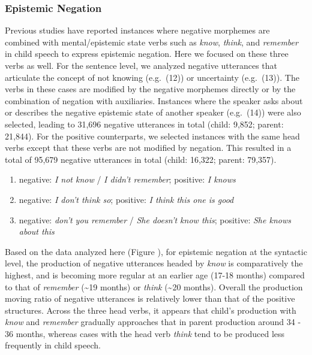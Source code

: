 \documentclass[
  english,
  man,floatsintext]{apa6}
\providecommand{\tightlist}{%
  \setlength{\itemsep}{0pt}\setlength{\parskip}{0pt}}
\begin{document}
\hypertarget{epistemic-negation}{%
\subsubsection{Epistemic Negation}\label{epistemic-negation}}

Previous studies have reported instances where negative morphemes are combined with mental/epistemic state verbs such as \emph{know}, \emph{think}, and \emph{remember} in child speech to express epistemic negation. Here we focused on these three verbs as well. For the sentence level, we analyzed negative utterances that articulate the concept of not knowing (e.g.~(12)) or uncertainty (e.g.~(13)). The verbs in these cases are modified by the negative morphemes directly or by the combination of negation with auxiliaries. Instances where the speaker asks about or describes the negative epistemic state of another speaker (e.g.~(14)) were also selected, leading to 31,696 negative utterances in total (child: 9,852; parent: 21,844).
For the positive counterparts, we selected instances with the same head verbs except that these verbs are not modified by negation. This resulted in a total of 95,679 negative utterances in total (child: 16,322; parent: 79,357).

\begin{enumerate}
\def\labelenumi{(\arabic{enumi})}
\setcounter{enumi}{11}
\tightlist
\item
  negative: \emph{I not know} / \emph{I didn't remember}; positive: \emph{I knows}
\item
  negative: \emph{I don't think so}; positive: \emph{I think this one is good}
\item
  negative: \emph{don't you remember} / \emph{She doesn't know this}; positive: \emph{She knows about this}
\end{enumerate}

Based on the data analyzed here (Figure ), for epistemic negation at the syntactic level, the production of negative utterances headed by \emph{know} is comparatively the highest, and is becoming more regular at an earlier age (17-18 months) compared to that of \emph{remember} (\textasciitilde19 months) or \emph{think} (\textasciitilde20 months). Overall the production moving ratio of negative utterances is relatively lower than that of the positive structures. Across the three head verbs, it appears that child's production with \emph{know} and \emph{remember} gradually approaches that in parent production around 34 - 36 months, whereas cases with the head verb \emph{think} tend to be produced less frequently in child speech.
\end{document}
